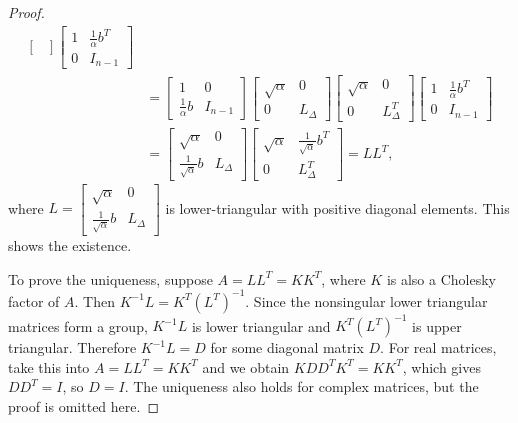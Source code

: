 \documentclass[12pt]{article}
\begin{document}
\begin{proof}
\[\begin{aligned}
\begin{bmatrix}
        \end{bmatrix}\begin{bmatrix}
            1 & \frac1\alpha b^T \\ 0 & I_{n-1}
        \end{bmatrix}\\
        &= \begin{bmatrix}
            1 & 0 \\ \frac1\alpha b & I_{n-1}
        \end{bmatrix}\begin{bmatrix}
            \sqrt\alpha & 0 \\ 0 & L_{\Delta}
        \end{bmatrix}\begin{bmatrix}
            \sqrt\alpha & 0 \\ 0 & L_{\Delta}^T
        \end{bmatrix}\begin{bmatrix}
            1 & \frac1\alpha b^T \\ 0 & I_{n-1}
        \end{bmatrix}\\
        &= \begin{bmatrix}
            \sqrt\alpha & 0 \\ \frac{1}{\sqrt\alpha}b & L_{\Delta}
        \end{bmatrix}\begin{bmatrix}
            \sqrt\alpha & \frac{1}{\sqrt\alpha}b^T \\ 0 & L_{\Delta}^T
        \end{bmatrix}
        = LL^T,
    \end{aligned}\]
    where \(L=\begin{bmatrix}
        \sqrt\alpha & 0 \\ \frac{1}{\sqrt\alpha}b & L_{\Delta}
    \end{bmatrix}\) is lower-triangular with positive diagonal elements. This shows the existence.\par
    To prove the uniqueness, suppose \(A=LL^T=KK^T\), where \(K\) is also a Cholesky factor of \(A\). Then \(K^{-1}L=K^T\left(L^T\right)^{-1}\). Since the nonsingular lower triangular matrices form a group, \(K^{-1}L\) is lower triangular and \(K^T\left(L^T\right)^{-1}\) is upper triangular. Therefore \(K^{-1}L=D\) for some diagonal matrix \(D\). For real matrices, take this into \(A=LL^T=KK^T\) and we obtain \(KDD^TK^T=KK^T\), which gives \(DD^T=I\), so \(D=I\). The uniqueness also holds for complex matrices, but the proof is omitted here.
\end{proof}
\end{document}

